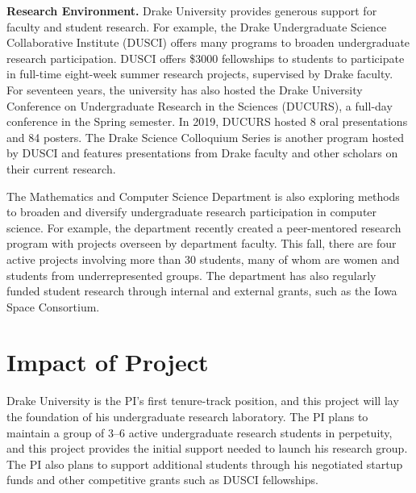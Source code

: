 \documentclass[11pt]{article}
\begin{document}
    \textbf{Research Environment.}
    Drake University provides generous support for faculty and student research.
    For example, the Drake Undergraduate Science Collaborative Institute (DUSCI) offers many programs to broaden undergraduate research participation.
    DUSCI offers \$3000 fellowships to students to participate in full-time eight-week summer research projects, supervised by Drake faculty.
    For seventeen years, the university has also hosted the Drake University Conference on Undergraduate Research in the Sciences (DUCURS), a full-day conference in the Spring semester.
    In 2019, DUCURS hosted 8 oral presentations and 84 posters.
    The Drake Science Colloquium Series is another program hosted by DUSCI and features presentations from Drake faculty and other scholars on their current research.

    The Mathematics and Computer Science Department is also exploring methods to broaden and diversify undergraduate research participation in computer science.
    For example, the department recently created a peer-mentored research program with projects overseen by department faculty.
    This fall, there are four active projects involving more than 30 students, many of whom are women and students from underrepresented groups.
    The department has also regularly funded student research through internal and external grants, such as the Iowa Space Consortium.

    \section{Impact of Project}
    Drake University is the PI's first tenure-track position, and this project will lay the foundation of his undergraduate research laboratory.
    The PI plans to maintain a group of 3--6 active undergraduate research students in perpetuity, and this project provides the initial support needed to launch his research group.
    The PI also plans to support additional students through his negotiated startup funds and other competitive grants such as DUSCI fellowships.
\end{document}
